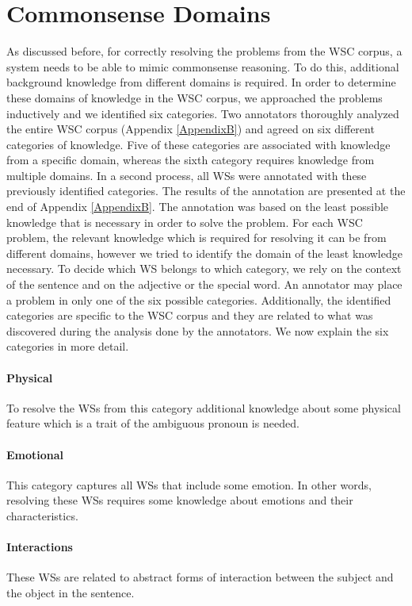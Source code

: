 \section{Commonsense Domains}
As discussed before, for correctly resolving the problems from the WSC corpus, a system needs to be able to mimic commonsense reasoning. To do this, additional background knowledge from different domains is required. In order to determine these domains of knowledge in the WSC corpus, we approached the problems inductively and we identified six categories. Two annotators thoroughly analyzed the entire WSC corpus (Appendix \ref{AppendixB}) and agreed on six different categories of knowledge. Five of these categories are associated with knowledge from a specific domain, whereas the sixth category requires knowledge from multiple domains.
In a second process, all WSs were annotated with these previously identified categories. The results of the annotation are presented at the end of Appendix \ref{AppendixB}. The annotation was based on the least possible knowledge that is necessary in order to solve the problem. For each WSC problem, the relevant knowledge which is required for resolving  it can be from different domains, however we tried to identify the domain of the least knowledge necessary. To decide which WS belongs to which category, we rely on the context of the sentence and on the adjective or the special word. An annotator may place a problem in only one of the six possible categories. Additionally, the identified categories are specific to the WSC corpus and they are related to what was discovered during the analysis done by the annotators. We now explain the six categories in more detail. 

\paragraph{Physical} To resolve the WSs from this category additional knowledge about some physical feature which is a trait of the ambiguous pronoun is needed.
 
\paragraph{Emotional} This category captures all WSs that include some emotion. In other words, resolving these WSs requires some knowledge about emotions and their characteristics.

\paragraph{Interactions} These WSs are related to abstract forms of interaction between the subject and the object in the sentence.

